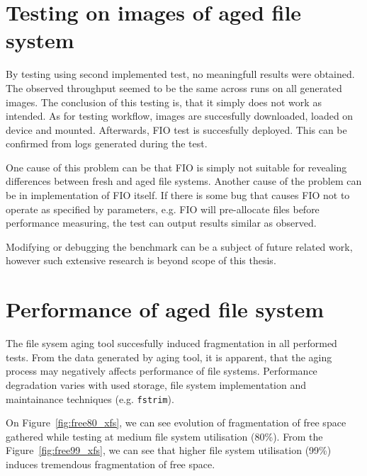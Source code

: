 \documentclass[
  color, %
  table, %
  lof,   %
  lot,   %
]{fithesis3}
\begin{document}
\section{Testing on images of aged file system}
\label{total_hdd}
By testing using second implemented test, no meaningfull results were obtained. The observed throughput seemed to be the same across runs on all generated images. The conclusion of this testing is, that it simply does not work as intended. As for testing workflow, images are succesfully downloaded, loaded on device and mounted. Afterwards, FIO test is succesfully deployed. This can be confirmed from logs generated during the test.

One cause of this problem can be that FIO is simply not suitable for revealing differences between fresh and aged file systems. Another cause of the problem can be in implementation of FIO itself. If there is some bug that causes FIO not to operate as specified by parameters, e.g. FIO will pre-allocate files before performance measuring, the test can output results similar as observed.

Modifying or debugging the benchmark can be a subject of future related work, however such extensive research is beyond scope of this thesis.



\section{Performance of aged file system}
The file sysem aging tool succesfully induced fragmentation in all performed tests. From the data generated by aging tool, it is apparent, that the aging process may negatively affects performance of file systems. Performance degradation varies with used storage, file system implementation and maintainance techniques (e.g. \texttt{fstrim}).

On Figure~\ref{fig:free80_xfs}, we can see evolution of fragmentation of free space gathered while testing at medium file system utilisation (80\%). From the Figure~\ref{fig:free99_xfs}, we can see that higher file system utilisation (99\%) induces tremendous fragmentation of free space.
\end{document}
